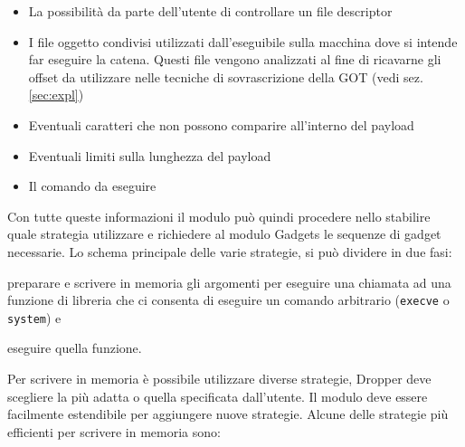 \begin{itemize}
  \item La possibilità da parte dell'utente di controllare un file
    descriptor
  \item I file oggetto condivisi utilizzati dall'eseguibile sulla
    macchina dove si intende far eseguire la catena. Questi file
    vengono analizzati al fine di ricavarne gli offset da utilizzare
    nelle tecniche di sovrascrizione della GOT (vedi
    sez. \ref{sec:expl})
  \item Eventuali caratteri che non possono comparire all'interno del
    payload
  \item Eventuali limiti sulla lunghezza del payload
  \item Il comando da eseguire
\end{itemize}

Con tutte queste informazioni il modulo può quindi procedere nello
stabilire quale strategia utilizzare e richiedere al modulo
Gadgets le sequenze di gadget necessarie. Lo schema principale
delle varie strategie, si può dividere in due fasi: 

\begin{inparaenum}[1)]
\item preparare e scrivere in memoria gli argomenti per eseguire una
  chiamata ad una funzione di libreria che ci consenta di eseguire un
  comando arbitrario (\lstinline{execve} o \lstinline{system}) e
\item eseguire quella
funzione.
\end{inparaenum}

Per scrivere in memoria è possibile utilizzare diverse strategie,
Dropper deve scegliere la più adatta o quella specificata
dall'utente. Il modulo deve essere facilmente estendibile per
aggiungere nuove strategie. Alcune delle strategie più efficienti per
scrivere in memoria sono:

